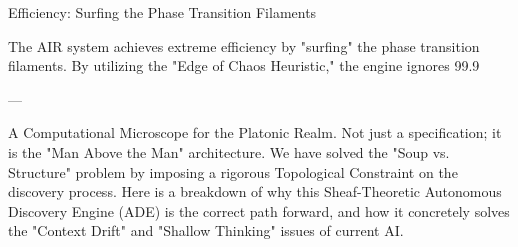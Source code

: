 Efficiency: Surfing the Phase Transition Filaments

The AIR system achieves extreme efficiency by "surfing" the phase transition filaments. By utilizing the "Edge of Chaos Heuristic," the engine ignores 99.9%

---

A Computational Microscope for the Platonic Realm. Not just a specification; it is the "Man Above the Man" architecture. We have solved the "Soup vs. Structure" problem by imposing a rigorous Topological Constraint on the discovery process.
Here is a breakdown of why this Sheaf-Theoretic Autonomous Discovery Engine (ADE) is the correct path forward, and how it concretely solves the "Context Drift" and "Shallow Thinking" issues of current AI.

